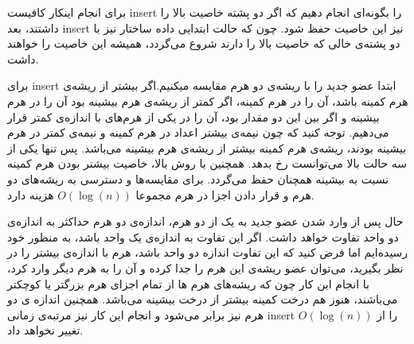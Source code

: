 برای انجام اینکار کافیست insert را بگونه‌ای انجام دهیم که اگر دو پشته خاصیت بالا را داشتند، بعد insert نیز این خاصیت حفظ شود. چون که حالت ابتدایی داده ساختار نیز با دو پشته‌ی خالی که خاصیت بالا را دارند شروع می‌گردد، همیشه این خاصیت را خواهند داشت.

برای insert ابتدا عضو جدید را با ریشه‌ی دو هرم مقایسه میکنیم.اگر بیشتر از ریشه‌ی هرم کمینه باشد، آن را در هرم کمینه، اگر کمتر از ریشه‌ی هرم بیشینه بود آن را در هرم بیشینه و اگر بین این دو مقدار بود، آن را در یکی از هرم‌های با اندازه‌ی کمتر قرار می‌دهیم. توجه کنید که چون نیمه‌ی بیشتر اعداد در هرم کمینه و نیمه‌ی کمتر در هرم بیشینه بودند، ریشه‌ی هرم کمینه بیشتر از ریشه‌ی هرم بیشینه می‌باشد. پس تنها یکی از سه حالت بالا می‌توانست رخ بدهد. همچنین با روش بالا، خاصیت بیشتر بودن هرم کمینه نسبت به بیشینه همچنان حفظ می‌گردد.
برای مقایسه‌ها و دسترسی به ریشه‌های دو هرم و قرار دادن اجزا در هرم مجموعا
$O(\log(n))$
هزینه دارد.

حال پس از وارد شدن عضو جدید به یک از دو هرم، اندازه‌ی دو هرم حداکثر به اندازه‌ی دو واحد تفاوت خواهد داشت.
اگر این تفاوت به اندازه‌ی یک واحد باشد، به منظور خود رسیده‌ایم اما فرض کنید که این تفاوت اندازه دو واحد باشد، هرم با اندازه‌ی بیشتر را در نظر بگیرید، می‌توان عضو ریشه‌ی این هرم را جدا کرده و آن را به هرم دیگر وارد کرد، با انجام این کار چون که ریشه‌های هرم ها از تمام اجزای هرم بزرگتر یا کوچکتر می‌باشند، هنوز هم درخت کمینه بیشتر از درخت بیشینه می‌باشد. همچنین اندازه ی دو هرم نیز برابر می‌شود و انجام این کار نیز مرتبه‌ی زمانی insert را از
$O(\log(n))$ 
تغییر نخواهد داد.













